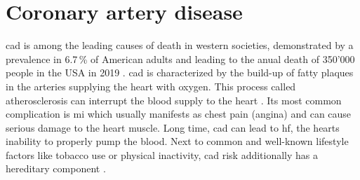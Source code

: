 \section{Coronary artery disease}
\label{sec:cad}
\Ac{cad} is among the leading causes of death in western societies, demonstrated by a prevalence in 6.7\,\% of American adults and leading to the anual death of 350'000 people in the USA in 2019 \cite{centersfordiseasecontrolandpreventionHeartDiseaseFacts2022, fryarPrevalenceUncontrolledRisk2012}. \Ac{cad} is characterized by the build-up of fatty plaques in the arteries supplying the heart with oxygen. This process called atherosclerosis can interrupt the blood supply to the heart \cite{nationalhealthserviceHeartAttack2017}. Its most common complication is \ac{mi} which usually manifests as chest pain (angina) and can cause serious damage to the heart muscle. Long time, \ac{cad} can lead to \ac{hf}, the hearts inability to properly pump the blood. Next to common and well-known lifestyle factors like tobacco use or physical inactivity, \ac{cad} risk additionally has a hereditary component \cite{montalescot2013ESCGuidelines2013}.


